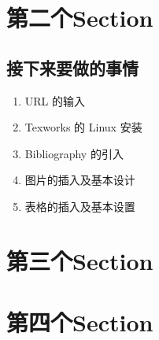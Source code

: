 \documentclass[UTF8,fancyhdr,a4paper]{ctexart}
\begin{document}
\newpage
\section{第二个Section}

\subsection{接下来要做的事情}
\begin{enumerate}
\item
URL 的输入
\item
Texworks 的 Linux 安装
\item
Bibliography 的引入
\item
图片的插入及基本设计
\item
表格的插入及基本设置



\end{enumerate}

\newpage
\section{第三个Section}

\newpage
\section{第四个Section}
\end{document}
